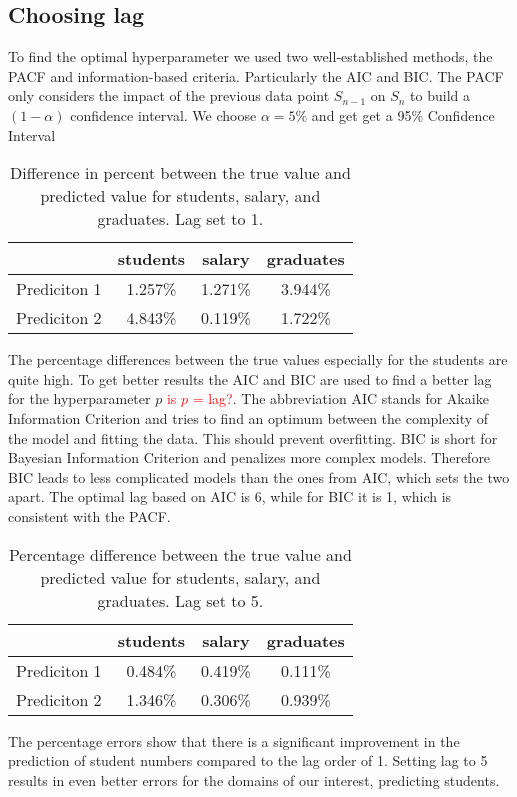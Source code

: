 \documentclass{article}
\theoremstyle{plain}
\theoremstyle{definition}
\theoremstyle{remark}
\begin{document}
\subsection{Choosing lag}\label{sec:methods:lag}
To find the optimal hyperparameter we used two well-established methods, the PACF and information-based criteria. Particularly the AIC and 
BIC. The PACF only considers the impact of the previous data point $S_{n-1}$ on $S_{n}$ to build a $(1-\alpha)$ confidence interval.
We choose $\alpha = 5\%$ and get get a 95\% Confidence Interval 
\begin{table}[H]
    \centering
    \begin{tabular}{c|c|c|c}
        & students & salary & graduates \\
        \hline
        Prediciton 1 & 1.257\% & 1.271\% & 3.944\% \\
        \hline
        Prediciton 2 & 4.843\% & 0.119\% & 1.722\%
    \end{tabular}
    \caption{Difference in percent between the true value and predicted value for students, salary, and graduates. Lag set to 1.}
\end{table}
The percentage differences between the true values especially for the students are quite high. To get better results
the AIC and BIC are used to find a better lag for the hyperparameter $p$ \textcolor{red}{is $p$ = lag?}. The abbreviation AIC
stands for Akaike Information Criterion and tries to find an optimum between the complexity of the model and fitting the data.
This should prevent overfitting. 
BIC is short for Bayesian Information Criterion and penalizes more complex models.
Therefore BIC leads to less complicated models than the ones from AIC, which sets the two apart.
The optimal lag based on AIC is 6, while for BIC it is 1, which is consistent with the PACF.
\begin{table}[H]
    \centering
    \begin{tabular}{c|c|c|c}
        & students & salary & graduates \\
        \hline
        Prediciton 1 & 0.484\% & 0.419\% & 0.111\% \\
        \hline
        Prediciton 2 & 1.346\% & 0.306\% & 0.939\%
    \end{tabular}
    \caption{Percentage difference between the true value and predicted value for students, salary, and graduates. Lag set to 5.}
\end{table}

The percentage errors show that there is a significant improvement in the prediction of student numbers compared to the lag order of 1.
Setting lag to 5 results in even better errors for the domains of our interest, predicting students.
\end{document}
